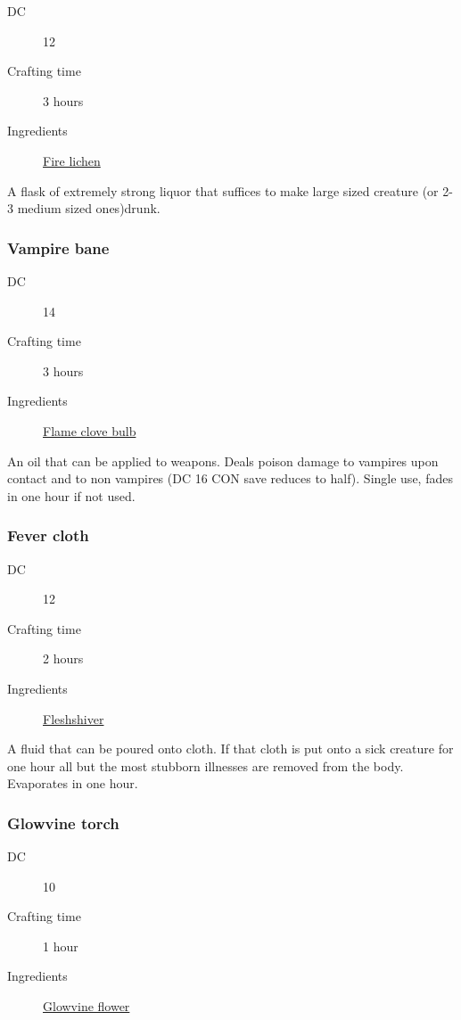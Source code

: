 \begin{description}
\item [DC] 12
\item [Crafting time] 3 hours
\item [Ingredients] \hyperref[Fire lichen]{Fire lichen}
\end{description}

A flask of extremely strong liquor that suffices to make large sized creature (or 2-3 medium sized ones)drunk.

\subsubsection{Vampire bane}
\label{Vampire bane}

\begin{description}
\item [DC] 14
\item [Crafting time] 3 hours
\item [Ingredients] \hyperref[Flame clove]{Flame clove bulb}
\end{description}

An oil that can be applied to weapons. Deals  poison damage to vampires upon contact and 
 to non vampires (DC 16 CON save reduces to half). Single use, fades in one hour if not used.

\subsubsection{Fever cloth}
\label{Fever cloth}

\begin{description}
\item [DC] 12
\item [Crafting time] 2 hours
\item [Ingredients] \hyperref[Fleshshiver]{Fleshshiver}
\end{description}

A fluid that can be poured onto cloth. If that cloth is put onto a sick creature for one hour
 all but the most stubborn illnesses are removed from the body. Evaporates in one hour.

\subsubsection{Glowvine torch}
\label{Glowvine torch}

\begin{description}
\item [DC] 10
\item [Crafting time] 1 hour
\item [Ingredients] \hyperref[Glowvine]{Glowvine flower}
\end{description}

